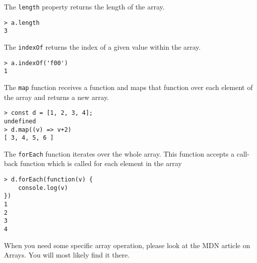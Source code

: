The \texttt{length} property returns the length of the array.
\begin{lstlisting}
> a.length
3
\end{lstlisting}

The \texttt{indexOf} returns the index of a given value within the array.

\begin{lstlisting}
> a.indexOf('f00')
1
\end{lstlisting}

The \texttt{map} function receives a function and maps that function over each element of the array and returns a new array.

\begin{lstlisting}
> const d = [1, 2, 3, 4];
undefined
> d.map((v) => v+2)
[ 3, 4, 5, 6 ]
\end{lstlisting}

The \texttt{forEach} function iterates over the whole array. This function accepts a call-back function which is called for each element in the array

\begin{lstlisting}
> d.forEach(function(v) {
    console.log(v)
})
1
2
3
4
\end{lstlisting}

When you need some specific array operation, please look at the MDN article on Arrays. You will most likely find it there.


